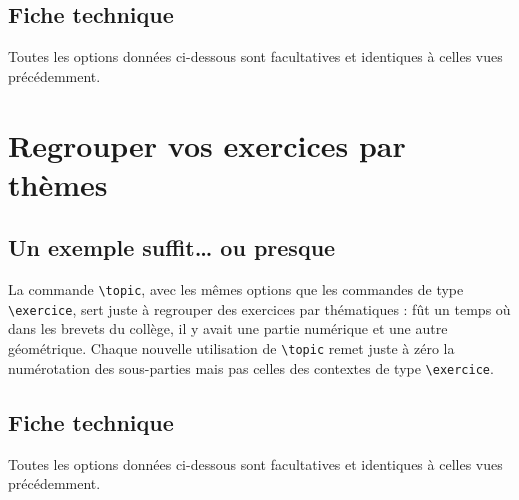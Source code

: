 \documentclass[12pt,a4paper]{scrartcl}
\makeatletter
\theoremstyle{definition}
\newcommand\resetallcnt{
    	\setcounter{lyxam@counter@topic}{0}
    	\setcounter{lyxam@counter@exercise}{0}
    	\setcounter{lyxam@counter@problem}{0}
    	\setcounter{lyxam@counter@bonus}{0}
    	\setcounter{lyxam@counter@subpart}{0}
    }
\newcommand\IDmacro{\@ifstar{\@IDmacroStar}{\@IDmacroNoStar}}
\newcommand\@IDmacroNoStar[3]{%
    \texttt{%
    	\textbackslash#1%
    	\IfStrEq{#2}{0}{}{%
    		\,\,[#2 Option%
			\IfStrEq{#2}{1}{}{s}]%
		}%
	    \IfStrEq{#3}{}{}{%
    		\,\,(#3 Argument%
			\IfStrEq{#3}{1}{}{s})%
		}
   	}
    \immediate\write\tempfile{macro@#1@#2@#3}%
}
\newcommand\@IDmacroStar[2]{%
    \@IDmacroNoStar{#1}{0}{#2}%
}
\makeatother
\begin{document}
\resetallcnt{}

\begin{tcblisting}{}
\exercise
\subpart
\subpart

\exercise
\subpart
\subpart
\end{tcblisting}


    \subsection{Fiche technique}

Toutes les options données ci-dessous sont facultatives et identiques à celles vues précédemment.

\bigskip


\IDmacro{subpart}{6}{}

\exosoptions{}



\section{Regrouper vos exercices par thèmes}

    \subsection{Un exemple suffit\dots{} ou presque}

La commande \verb+\topic+, avec les mêmes options que les commandes de type \verb+\exercice+, sert juste à regrouper des exercices par thématiques : fût un temps où dans les brevets du collège, il y avait une partie numérique et une autre géométrique.
Chaque nouvelle utilisation de \verb+\topic+ remet juste à zéro la numérotation des sous-parties mais pas celles des contextes de type \verb+\exercice+.

\resetallcnt{}

\begin{tcblisting}{}
\topic
\exercise
\exercise

\topic
\exercise
\end{tcblisting}


    \subsection{Fiche technique}

Toutes les options données ci-dessous sont facultatives et identiques à celles vues précédemment.
\end{document}
